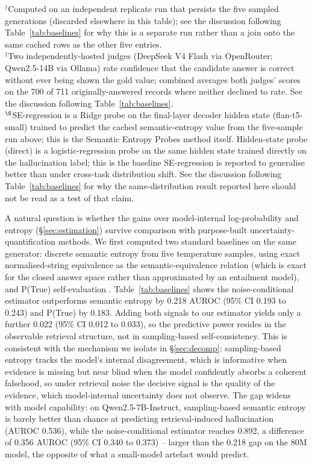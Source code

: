 \documentclass[sn-basic]{sn-jnl}
\theoremstyle{thmstyleone}
\theoremstyle{thmstyletwo}
\begin{document}
\begin{table}[tbp]
\vspace{2pt}
{\scriptsize $^\dagger$Computed on an independent replicate run that persists the five
sampled generations (discarded elsewhere in this table); see the discussion
following Table~\ref{tab:baselines} for why this is a separate run rather
than a join onto the same cached rows as the other five entries.\\
$^\ddagger$Two independently-hosted judges (DeepSeek V4 Flash via OpenRouter;
Qwen2.5-14B via Ollama) rate confidence that the candidate answer is correct
without ever being shown the gold value; combined averages both judges'
scores on the 700 of 711 originally-answered records where neither declined
to rate. See the discussion following Table~\ref{tab:baselines}.\\
$^\S$SE-regression is a Ridge probe on the final-layer decoder hidden state
(flan-t5-small) trained to predict the cached semantic-entropy value from
the five-sample run above; this is the Semantic Entropy Probes method
itself. Hidden-state probe (direct) is a logistic-regression probe on the
same hidden state trained directly on the hallucination label; this is the
baseline SE-regression is reported to generalise better than under
cross-task distribution shift. See the discussion following
Table~\ref{tab:baselines} for why the same-distribution result reported
here should not be read as a test of that claim.}
\end{table}

A natural question is whether the gains over model-internal log-probability
and entropy (\S\ref{sec:estimation}) survive comparison with purpose-built
uncertainty-quantification methods. We first computed two standard
baselines on the same generator: discrete semantic entropy
\citep{kuhn2023semantic,farquhar2024nature} from five temperature samples,
using exact normalised-string equivalence as the semantic-equivalence
relation (which is exact for the closed answer space rather than approximated
by an entailment model), and P(True) self-evaluation
\citep{kadavath2022language}. Table~\ref{tab:baselines} shows the noise-conditional
estimator outperforms semantic entropy by 0.218 AUROC
(95\% CI 0.193 to 0.243) and P(True) by 0.183. Adding both signals to our
estimator yields only a further 0.022 (95\% CI 0.012 to 0.033), so the
predictive power resides in the observable retrieval structure, not in
sampling-based self-consistency. This is consistent with the
mechanism we isolate in \S\ref{sec:decomp}: sampling-based entropy tracks the
model's internal disagreement, which is informative when evidence is missing
but near blind when the model confidently absorbs a coherent falsehood, so under
retrieval noise the decisive signal is the quality of the evidence, which
model-internal uncertainty does not observe. The gap widens with model capability: on Qwen2.5-7B-Instruct, sampling-based
semantic entropy is barely better than chance at predicting
retrieval-induced hallucination (AUROC 0.536), while the noise-conditional
estimator reaches 0.892, a difference of 0.356 AUROC (95\% CI 0.340 to
0.373) -- larger than the 0.218 gap on the 80M model, the opposite of what a
small-model artefact would predict.
\end{document}
